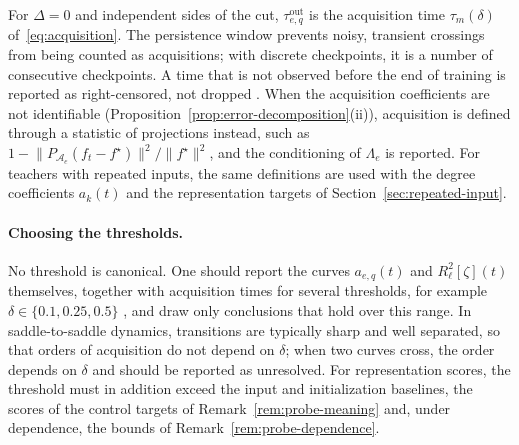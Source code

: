 \documentclass[11pt]{article}
\newcommand{\norm}[1]{\lVert #1\rVert}
\theoremstyle{definition}
\numberwithin{equation}{section}
\begin{document}
For $\Delta=0$ and independent sides of the cut, $\tau^{\mathrm{out}}_{e,q}$ is the acquisition time $\tau_m(\delta)$ of~\eqref{eq:acquisition}. The persistence window prevents noisy, transient crossings from being counted as acquisitions; with discrete checkpoints, it is a number of consecutive checkpoints. A time that is not observed before the end of training is reported as right-censored, not dropped \citep[Section~7.3]{hfl_surrogate}. When the acquisition coefficients are not identifiable (Proposition~\ref{prop:error-decomposition}(ii)), acquisition is defined through a statistic of projections instead, such as $1-\norm{P_{\mathcal A_e}(f_t-f^\star)}^2/\norm{f^\star}^2$, and the conditioning of $\Lambda_e$ is reported. For teachers with repeated inputs, the same definitions are used with the degree coefficients $a_k(t)$ and the representation targets of Section~\ref{sec:repeated-input}.

\paragraph{Choosing the thresholds.}
No threshold is canonical. One should report the curves $a_{e,q}(t)$ and $R^2_\ell[\zeta](t)$ themselves, together with acquisition times for several thresholds, for example $\delta\in\{0.1,0.25,0.5\}$ \citep[Section~7.3]{hfl_surrogate}, and draw only conclusions that hold over this range. In saddle-to-saddle dynamics, transitions are typically sharp and well separated, so that orders of acquisition do not depend on $\delta$; when two curves cross, the order depends on $\delta$ and should be reported as unresolved. For representation scores, the threshold must in addition exceed the input and initialization baselines, the scores of the control targets of Remark~\ref{rem:probe-meaning} and, under dependence, the bounds of Remark~\ref{rem:probe-dependence}.
\end{document}
